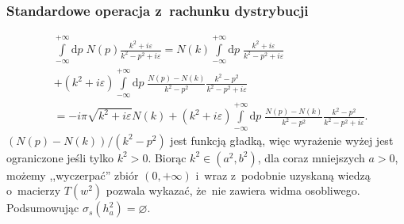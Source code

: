 \documentclass{beamer} \mode<presentation>
\let\emptyset\varnothing
\newcommand{\fr}{\frac}
\newcommand{\mr}{\mathrm}
\newcommand{\veps}{\varepsilon}
\newcommand{\si}{\sigma}
\newcommand{\de}{\mr{d}}
\newcommand{\Int}{\int\limits}
\newcommand{\IntA}[1]{\Int_{ -\infty }^{ +\infty } \de #1 \;}
\begin{document}
\begin{frame}[fragile]
  \frametitle{Standardowe operacja z~rachunku dystrybucji}

  \begin{block}{}
    \begin{equation}
      \label{eq:23}
      \begin{split}
        & \IntA{ p } N( p ) \fr{ k^{ 2 } + i \veps }{ k^{ 2 } - p^{ 2
          } + i \veps } = N( k ) \IntA{ p } \fr{ k^{ 2 } + i \veps}
        { k^{ 2 } - p^{ 2 } + i \veps } \\
        & + ( k^{ 2 } + i \veps ) \IntA{ p } \fr{ N( p ) - N( k ) } {
          k^{ 2 } - p^{ 2 } }
        \fr{ k^{ 2 } - p^{ 2 } }{ k^{ 2 } - p^{ 2 } + i \veps } \\
        &= -i \pi \sqrt{ k^{ 2 } + i \veps } N( k ) + ( k^{ 2 } + i
        \veps ) \IntA{ p } \fr{ N( p ) - N( k ) }{ k^{ 2 } - p^{ 2 } }
        \fr{ k^{ 2 } - p^{ 2 } }{ k^{ 2 } - p^{ 2 } + i \veps }.
      \end{split}
    \end{equation}
    $( N( p ) - N( k ) )/( k^{ 2 } - p^{ 2 } )$ jest funkcją gładką,
    więc wyrażenie wyżej jest ograniczone jeśli tylko $k^{ 2 } > 0$.
    Biorąc $k^{ 2 } \in ( a^{ 2 }, b^{ 2 } )$, dla coraz mniejszych
    $a > 0$, możemy ,,wyczerpać'' zbiór $( 0, +\infty )$ i~wraz
    z~podobnie uzyskaną wiedzą o~macierzy $T( w^{ 2 } )$ pozwala
    wykazać, że~nie zawiera widma osobliwego. Podsumowując
    $\si_{ s }( h_{ a }^{ 2 } ) = \emptyset$.
  \end{block}

\end{frame}










\end{document}

